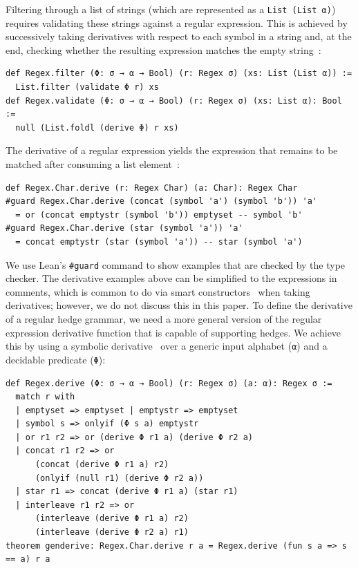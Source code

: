 \documentclass[runningheads]{llncs}
\begin{document}
Filtering through a list of strings (which are represented as a \lstinline{List (List α)}) requires validating these strings against a regular expression. This is achieved by successively taking derivatives with respect to each symbol in a string and, at the end, checking whether the resulting expression matches the empty string~\cite{brzozowski1964derivatives,reexamined}:
\begin{lstlisting}[label=def Regex.validate]
def Regex.filter (Φ: σ → α → Bool) (r: Regex σ) (xs: List (List α)) :=
  List.filter (validate Φ r) xs
def Regex.validate (Φ: σ → α → Bool) (r: Regex σ) (xs: List α): Bool :=
  null (List.foldl (derive Φ) r xs)
\end{lstlisting}
The derivative of a regular expression yields the expression that remains to be matched after consuming a list element~\cite{brzozowski1964derivatives,reexamined}:
\begin{lstlisting}[label=def Regex.Char.derive]
def Regex.Char.derive (r: Regex Char) (a: Char): Regex Char
#guard Regex.Char.derive (concat (symbol 'a') (symbol 'b')) 'a'
  = or (concat emptystr (symbol 'b')) emptyset -- symbol 'b'
#guard Regex.Char.derive (star (symbol 'a')) 'a'
  = concat emptystr (star (symbol 'a')) -- star (symbol 'a')
\end{lstlisting}
We use Lean's \lstinline{#guard} command to show examples that are checked by the type checker.
The derivative examples above can be simplified to the expressions in comments, which is common to do via smart constructors~\cite{reexamined} when taking derivatives; however, we do not discuss this in this paper.
To define the derivative of a regular hedge grammar, we need a more general version of the regular expression derivative function that is capable of supporting hedges. 
We achieve this by using a symbolic derivative~\cite{stanford2021symbolic,elliott2021symbolic} over a generic input alphabet (\lstinline{α}) and a decidable predicate (\lstinline{Φ}):
\begin{lstlisting}[label=def Regex.derive]
def Regex.derive (Φ: σ → α → Bool) (r: Regex σ) (a: α): Regex σ :=
  match r with
  | emptyset => emptyset | emptystr => emptyset
  | symbol s => onlyif (Φ s a) emptystr
  | or r1 r2 => or (derive Φ r1 a) (derive Φ r2 a)
  | concat r1 r2 => or
      (concat (derive Φ r1 a) r2)
      (onlyif (null r1) (derive Φ r2 a))
  | star r1 => concat (derive Φ r1 a) (star r1)
  | interleave r1 r2 => or
      (interleave (derive Φ r1 a) r2)
      (interleave (derive Φ r2 a) r1)
theorem genderive: Regex.Char.derive r a = Regex.derive (fun s a => s == a) r a
\end{lstlisting}
\end{document}
